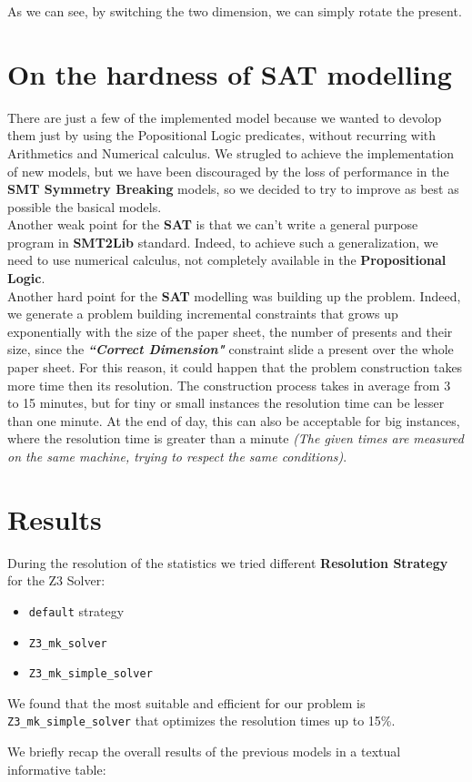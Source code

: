 As we can see, by switching the two dimension, we can simply rotate the present.



\section{On the hardness of SAT modelling}
There are just a few of the implemented model because we wanted to devolop them just by using the Popositional Logic predicates, without recurring with Arithmetics
and Numerical calculus. We strugled to achieve the implementation of new models, but we have been discouraged by the loss of performance in the \textbf{SMT Symmetry Breaking} models,
so we decided to try to improve as best as possible the basical models.\\
Another weak point for the \textbf{SAT} is that we can't write a general purpose program in \textbf{SMT2Lib} standard. Indeed, to achieve such a generalization, we need to use
numerical calculus, not completely available in the \textbf{Propositional Logic}.\\

Another hard point for the \textbf{SAT} modelling was building up the problem. Indeed, we generate a problem building incremental constraints that grows up exponentially with the size of
the paper sheet, the number of presents and their size, since the \textbf{\textit{``Correct Dimension"}} constraint slide a present over the whole paper sheet. For this reason, it could happen
that the problem construction takes more time then its resolution. The construction process takes in average from 3 to 15 minutes, but for tiny or small instances the resolution time can be lesser
than one minute. At the end of day, this can also be acceptable for big instances, where the resolution time is greater than a minute
\textit{(The given times are measured on the same machine, trying to respect the same conditions)}.

\section{Results}
During the resolution of the statistics we tried different \textbf{Resolution Strategy} for the Z3 Solver:
\begin{itemize}
	\item \texttt{default} strategy
	\item \texttt{Z3\_mk\_solver}
	\item \texttt{Z3\_mk\_simple\_solver}
\end{itemize}
We found that the most suitable and efficient for our problem is \texttt{Z3\_mk\_simple\_solver} that optimizes the resolution times up to 15\%.

We briefly recap the overall results of the previous models in a textual informative table:


